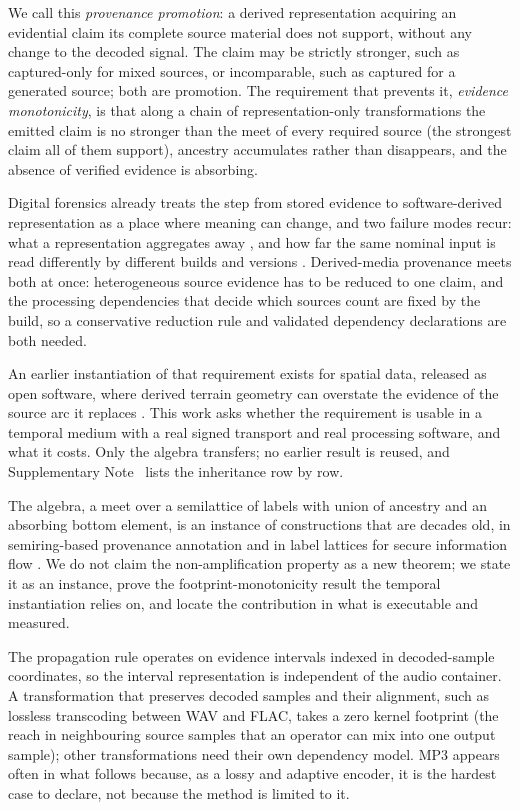 \documentclass[preprint,3p,11pt,authoryear]{elsarticle}
\begin{document}
We call this \emph{provenance promotion}: a derived representation acquiring an
evidential claim its complete source material does not support, without any
change to the decoded signal. The claim may be strictly stronger, such as
captured-only for mixed sources, or incomparable, such as captured for a
generated source; both are promotion. The requirement that prevents it,
\emph{evidence monotonicity}, is that along a chain of representation-only
transformations the emitted claim is no stronger than the meet of every required
source (the strongest claim all of them support), ancestry accumulates rather than disappears, and the absence of verified
evidence is absorbing.

Digital forensics already treats the step from stored evidence to
software-derived representation as a place where meaning can change, and two
failure modes recur: what a representation aggregates away
\citep{hargreaves2024abstract,andersen2025toolbias}, and how far the same
nominal input is read differently by different builds and versions
\citep{nordvik2022exfat,kuelper2026testdriven}. Derived-media provenance meets
both at once: heterogeneous source evidence has to be reduced to one claim, and
the processing dependencies that decide which sources count are fixed by the
build, so a conservative reduction rule and validated dependency declarations
are both needed.

An earlier instantiation of that requirement exists for spatial data, released
as open software, where derived terrain geometry can overstate the evidence of
the source arc it replaces \citep{urias2026emtrf}. This work asks whether the requirement is
usable in a temporal medium with a real signed transport and real processing
software, and what it costs. Only the algebra transfers; no earlier result is
reused, and Supplementary Note~\NoteTransfer{} lists the inheritance row by
row.


The algebra, a meet over
a semilattice of labels with union of ancestry and an absorbing bottom element,
is an instance of constructions that are decades old, in semiring-based
provenance annotation \citep{green2007provenance} and in label lattices for
secure information flow \citep{denning1976lattice,goguen1982noninterference}.
We do not claim the non-amplification property as a new theorem; we state it as
an instance, prove the footprint-monotonicity result the temporal
instantiation relies on, and locate the contribution in what is executable and
measured.

The propagation rule operates on evidence intervals indexed in decoded-sample
coordinates, so the interval representation is independent of the audio
container. A transformation that preserves decoded samples and their alignment,
such as lossless transcoding between WAV and FLAC, takes a zero kernel
footprint (the reach in neighbouring source samples that an operator can mix
into one output sample); other transformations need their own dependency model.
MP3 appears often in what follows because, as a lossy and adaptive encoder, it
is the hardest case to declare, not because the method is limited to it.
\end{document}
